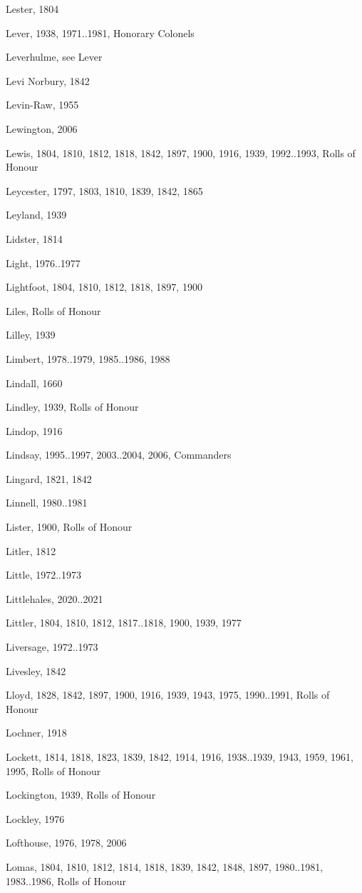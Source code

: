 {\begin{theindex}
\item Lester, 1804
\item Lever, 1938, 1971..1981, Honorary Colonels
\item Leverhulme, see Lever
\item Levi Norbury, 1842
\item Levin-Raw, 1955
\item Lewington, 2006
\item Lewis, 1804, 1810, 1812, 1818, 1842, 1897, 1900, 1916, 1939, 1992..1993, Rolls of Honour
\item Leycester, 1797, 1803, 1810, 1839, 1842, 1865
\item Leyland, 1939
\item Lidster, 1814
\item Light, 1976..1977
\item Lightfoot, 1804, 1810, 1812, 1818, 1897, 1900
\item Liles, Rolls of Honour
\item Lilley, 1939
\item Limbert, 1978..1979, 1985..1986, 1988
\item Lindall, 1660
\item Lindley, 1939, Rolls of Honour
\item Lindop, 1916
\item Lindsay, 1995..1997, 2003..2004, 2006, Commanders
\item Lingard, 1821, 1842
\item Linnell, 1980..1981
\item Lister, 1900, Rolls of Honour
\item Litler, 1812
\item Little, 1972..1973
\item Littlehales, 2020..2021
\item Littler, 1804, 1810, 1812, 1817..1818, 1900, 1939, 1977
\item Liversage, 1972..1973
\item Livesley, 1842
\item Lloyd, 1828, 1842, 1897, 1900, 1916, 1939, 1943, 1975, 1990..1991, Rolls of Honour
\item Lochner, 1918
\item Lockett, 1814, 1818, 1823, 1839, 1842, 1914, 1916, 1938..1939, 1943, 1959, 1961, 1995, Rolls of Honour
\item Lockington, 1939, Rolls of Honour
\item Lockley, 1976
\item Lofthouse, 1976, 1978, 2006
\item Lomas, 1804, 1810, 1812, 1814, 1818, 1839, 1842, 1848, 1897, 1980..1981, 1983..1986, Rolls of Honour

\end{theindex}}
